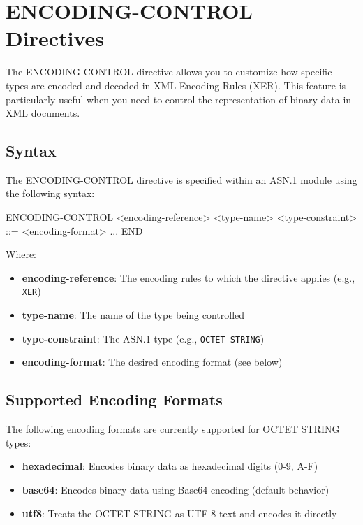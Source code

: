 \documentclass[english,oneside,12pt]{book}
\begin{document}
\section{\label{sec:ENCODING-CONTROL}ENCODING-CONTROL Directives}

The ENCODING-CONTROL directive allows you to customize how specific types are encoded 
and decoded in XML Encoding Rules (XER). This feature is particularly useful when you 
need to control the representation of binary data in XML documents.

\subsection*{Syntax}

The ENCODING-CONTROL directive is specified within an ASN.1 module using the following syntax:

\begin{asn}
ENCODING-CONTROL <encoding-reference>
    <type-name> <type-constraint> ::= <encoding-format>
    ...
END
\end{asn}

Where:
\begin{itemize}
\item \textbf{encoding-reference}: The encoding rules to which the directive applies (e.g., \texttt{XER})
\item \textbf{type-name}: The name of the type being controlled
\item \textbf{type-constraint}: The ASN.1 type (e.g., \texttt{OCTET STRING})
\item \textbf{encoding-format}: The desired encoding format (see below)
\end{itemize}

\subsection*{Supported Encoding Formats}

The following encoding formats are currently supported for OCTET STRING types:

\begin{itemize}
\item \textbf{hexadecimal}: Encodes binary data as hexadecimal digits (0-9, A-F)
\item \textbf{base64}: Encodes binary data using Base64 encoding (default behavior)
\item \textbf{utf8}: Treats the OCTET STRING as UTF-8 text and encodes it directly
\end{itemize}
\end{document}
